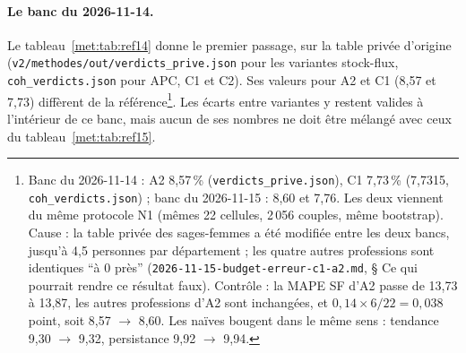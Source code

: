 \paragraph{Le banc du 2026-11-14.} Le tableau~\ref{met:tab:ref14} donne le premier passage, sur la table
privée d'origine (\texttt{v2/methodes/out/verdicts\_prive.json} pour les variantes stock-flux,
\texttt{coh\_verdicts.json} pour APC, C1 et C2). Ses valeurs pour A2 et C1 (8,57 et 7,73) diffèrent de la
référence\footnote{Banc du 2026-11-14 : A2 8,57\,\%\mesure{} (\texttt{verdicts\_prive.json}), C1
7,73\,\%\mesure{} (7,7315, \texttt{coh\_verdicts.json}) ; banc du 2026-11-15 : 8,60\mesure{} et
7,76\mesure. Les deux viennent du même protocole N1 (mêmes 22 cellules, 2\,056 couples, même bootstrap).
Cause : la table privée des sages-femmes a été modifiée entre les deux bancs, jusqu'à 4,5\mesure{}
personnes par département ; les quatre autres professions sont identiques \enquote{à 0 près}
(\texttt{2026-11-15-budget-erreur-c1-a2.md}, § Ce qui pourrait rendre ce résultat faux). Contrôle : la
MAPE SF d'A2 passe de 13,73\mesure{} à 13,87\mesure, les autres professions d'A2 sont inchangées, et
$0{,}14 \times 6/22 = 0{,}038$\derive{} point, soit 8,57 $\to$ 8,60. Les naïves bougent dans le même
sens : tendance 9,30 $\to$ 9,32\mesure, persistance 9,92 $\to$ 9,94\mesure.}. Les écarts entre variantes y
restent valides à l'intérieur de ce banc, mais aucun de ses nombres ne doit être mélangé avec ceux du
tableau~\ref{met:tab:ref15}.

